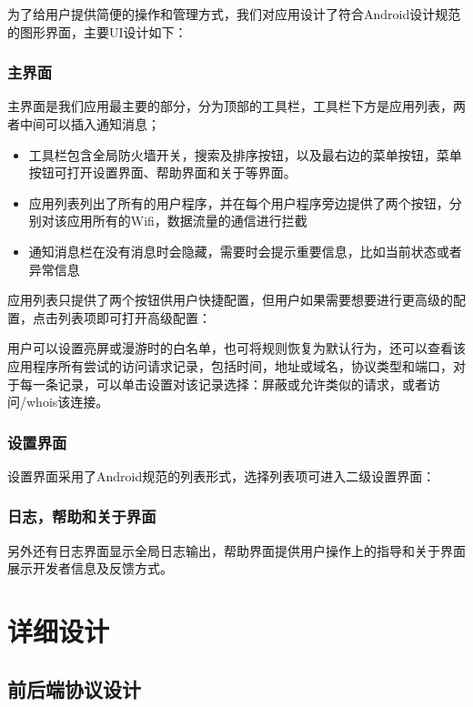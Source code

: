 \documentclass[format=final, language=chinese, degree=fyp]{hustthesis}
\begin{document}

为了给用户提供简便的操作和管理方式，我们对应用设计了符合Android设计规范的图形界面，主要UI设计如下：

\subsection{主界面}

主界面是我们应用最主要的部分，分为顶部的工具栏，工具栏下方是应用列表，两者中间可以插入通知消息；
\begin{itemize}
    \item 工具栏包含全局防火墙开关，搜索及排序按钮，以及最右边的菜单按钮，菜单按钮可打开设置界面、帮助界面和关于等界面。
    \item 应用列表列出了所有的用户程序，并在每个用户程序旁边提供了两个按钮，分别对该应用所有的Wifi，数据流量的通信进行拦截
    \item 通知消息栏在没有消息时会隐藏，需要时会提示重要信息，比如当前状态或者异常信息
\end{itemize}

应用列表只提供了两个按钮供用户快捷配置，但用户如果需要想要进行更高级的配置，点击列表项即可打开高级配置：


用户可以设置亮屏或漫游时的白名单，也可将规则恢复为默认行为，还可以查看该应用程序所有尝试的访问请求记录，包括时间，地址或域名，协议类型和端口，对于每一条记录，可以单击设置对该记录选择：屏蔽或允许类似的请求，或者访问/whois该连接。

\subsection{设置界面}

设置界面采用了Android规范的列表形式，选择列表项可进入二级设置界面：

\subsection{日志，帮助和关于界面}

另外还有日志界面显示全局日志输出，帮助界面提供用户操作上的指导和关于界面展示开发者信息及反馈方式。

\chapter{详细设计}

\section{前后端协议设计}
\end{document}
